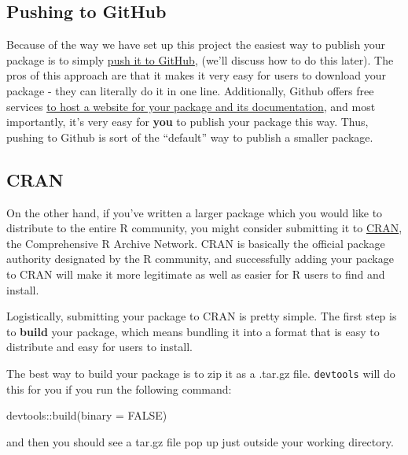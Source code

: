 \documentclass[
]{book}
\newenvironment{Shaded}{\begin{snugshade}}{\end{snugshade}}
\newcommand{\AttributeTok}[1]{\textcolor[rgb]{0.77,0.63,0.00}{#1}}
\newcommand{\ConstantTok}[1]{\textcolor[rgb]{0.00,0.00,0.00}{#1}}
\newcommand{\FunctionTok}[1]{\textcolor[rgb]{0.00,0.00,0.00}{#1}}
\newcommand{\NormalTok}[1]{#1}
\newcommand{\SpecialCharTok}[1]{\textcolor[rgb]{0.00,0.00,0.00}{#1}}
\begin{document}
\hypertarget{pushing-to-github}{%
\subsection{Pushing to GitHub}\label{pushing-to-github}}

Because of the way we have set up this project the easiest way to publish your package is to simply \href{./version-control}{push it to GitHub}, (we'll discuss how to do this later). The pros of this approach are that it makes it very easy for users to download your package - they can literally do it in one line. Additionally, Github offers free services \href{https://pages.github.com/}{to host a website for your package and its documentation}, and most importantly, it's very easy for \textbf{you} to publish your package this way. Thus, pushing to Github is sort of the ``default'' way to publish a smaller package.

\hypertarget{cran}{%
\subsection{CRAN}\label{cran}}

On the other hand, if you've written a larger package which you would like to distribute to the entire R community, you might consider submitting it to \href{https://cran.r-project.org/}{CRAN}, the Comprehensive R Archive Network. CRAN is basically the official package authority designated by the R community, and successfully adding your package to CRAN will make it more legitimate as well as easier for R users to find and install.

Logistically, submitting your package to CRAN is pretty simple. The first step is to \textbf{build} your package, which means bundling it into a format that is easy to distribute and easy for users to install.

The best way to build your package is to zip it as a .tar.gz file. \texttt{devtools} will do this for you if you run the following command:

\begin{Shaded}
\begin{Highlighting}[]
\NormalTok{devtools}\SpecialCharTok{::}\FunctionTok{build}\NormalTok{(}\AttributeTok{binary =} \ConstantTok{FALSE}\NormalTok{)}
\end{Highlighting}
\end{Shaded}

and then you should see a tar.gz file pop up just outside your working directory.
\end{document}
